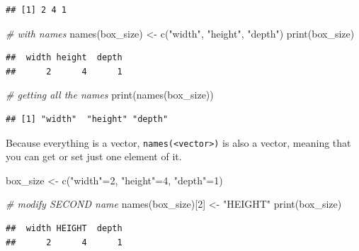\documentclass[
]{book}
\newenvironment{Shaded}{\begin{snugshade}}{\end{snugshade}}
\newcommand{\CommentTok}[1]{\textcolor[rgb]{0.56,0.35,0.01}{\textit{#1}}}
\newcommand{\DecValTok}[1]{\textcolor[rgb]{0.00,0.00,0.81}{#1}}
\newcommand{\FunctionTok}[1]{\textcolor[rgb]{0.00,0.00,0.00}{#1}}
\newcommand{\NormalTok}[1]{#1}
\newcommand{\OtherTok}[1]{\textcolor[rgb]{0.56,0.35,0.01}{#1}}
\newcommand{\StringTok}[1]{\textcolor[rgb]{0.31,0.60,0.02}{#1}}
\begin{document}
\begin{verbatim}
## [1] 2 4 1
\end{verbatim}

\begin{Shaded}
\begin{Highlighting}[]
\CommentTok{\# with names}
\FunctionTok{names}\NormalTok{(box\_size) }\OtherTok{\textless{}{-}} \FunctionTok{c}\NormalTok{(}\StringTok{"width"}\NormalTok{, }\StringTok{"height"}\NormalTok{, }\StringTok{"depth"}\NormalTok{)}
\FunctionTok{print}\NormalTok{(box\_size)}
\end{Highlighting}
\end{Shaded}

\begin{verbatim}
##  width height  depth 
##      2      4      1
\end{verbatim}

\begin{Shaded}
\begin{Highlighting}[]
\CommentTok{\# getting all the names}
\FunctionTok{print}\NormalTok{(}\FunctionTok{names}\NormalTok{(box\_size))}
\end{Highlighting}
\end{Shaded}

\begin{verbatim}
## [1] "width"  "height" "depth"
\end{verbatim}

Because everything is a vector, \texttt{names(\textless{}vector\textgreater{})} is also a vector, meaning that you can get or set just one element of it.

\begin{Shaded}
\begin{Highlighting}[]
\NormalTok{box\_size }\OtherTok{\textless{}{-}} \FunctionTok{c}\NormalTok{(}\StringTok{"width"}\OtherTok{=}\DecValTok{2}\NormalTok{, }\StringTok{"height"}\OtherTok{=}\DecValTok{4}\NormalTok{, }\StringTok{"depth"}\OtherTok{=}\DecValTok{1}\NormalTok{) }

\CommentTok{\# modify SECOND name}
\FunctionTok{names}\NormalTok{(box\_size)[}\DecValTok{2}\NormalTok{] }\OtherTok{\textless{}{-}} \StringTok{"HEIGHT"}
\FunctionTok{print}\NormalTok{(box\_size)}
\end{Highlighting}
\end{Shaded}

\begin{verbatim}
##  width HEIGHT  depth 
##      2      4      1
\end{verbatim}
\end{document}
